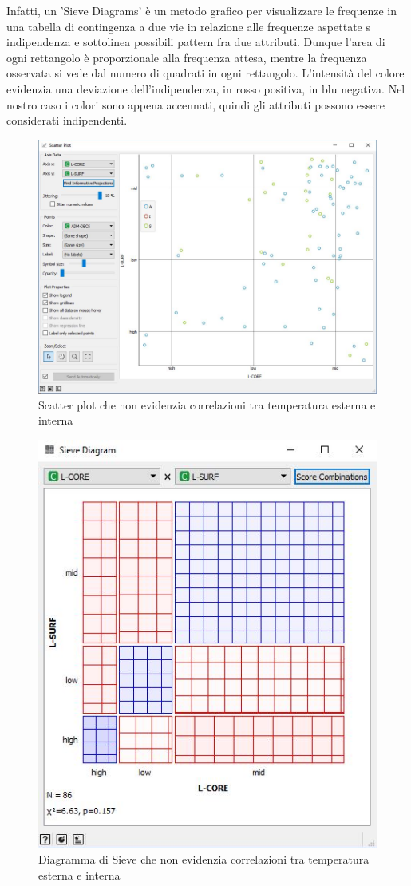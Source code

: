 \documentclass[a4paper, 12p]{report}
\begin{document}
Infatti, un 'Sieve Diagrams' è un metodo grafico per visualizzare le frequenze in una tabella di contingenza a due vie in relazione alle frequenze aspettate s indipendenza e sottolinea possibili pattern fra due attributi. Dunque l’area di ogni rettangolo è proporzionale alla frequenza attesa,  mentre la frequenza osservata si vede dal numero di quadrati in ogni rettangolo. L'intensità del colore evidenzia una deviazione dell'indipendenza, in rosso positiva, in blu negativa. Nel nostro caso i colori sono appena accennati, quindi gli attributi possono essere considerati indipendenti.
\begin{figure}	
	\centering
	\includegraphics[scale = 0.5]{img/ScatterJPG.JPG}
	\caption{Scatter plot che non evidenzia correlazioni tra temperatura esterna e interna }\label{fig:4}
\end{figure}
\begin{figure}	
	\centering
	\includegraphics[scale = 0.6]{img/Sieve.JPG}
	\caption{Diagramma di Sieve che non evidenzia correlazioni tra temperatura esterna e interna }\label{fig:5}
\end{figure}
\end{document}
